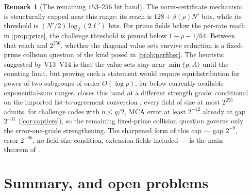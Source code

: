 \documentclass[11pt]{article}
\theoremstyle{definition}
\newtheorem{remark}[remark]{Remark}
\newcommand{\Acl}{A}
\begin{document}
\begin{remark}[The remaining $153$--$256$ bit band]\label{rem:capstone}
The norm-certificate mechanism is structurally capped near this range: its reach is $128+\beta(\rho)N'$ bits, while its threshold is $(N'/2)\log_2(2\ell')$ bits.  For prime fields below the per-rate reach in \cref{prop:prize}, the challenge threshold is pinned below $1-\rho-1/64$.  Between that reach and $2^{256}$, whether the diagonal value sets survive reduction is a fixed-prime collision question of the kind posed in \cref{prob:perfiber}.  The heuristic suggested by V13--V14 is that the value sets stay near $\min\{p,\Acl\}$ until the counting limit, but proving such a statement would require equidistribution for power-of-two subgroups of order $O(\log p)$, far below currently available exponential-sum ranges.   closes this band at a different strength grade: conditional on the imported list-to-agreement conversion \cite{CS25,ABF26}, every field of size at most $2^{256}$ admits, for challenge codes with $n\le q/2$, MCA error at least $2^{-42}$ already at gap $2^{-11}$ (\cref{cor:captiers}), so the remaining fixed-prime collision question governs only the error-one-grade strengthening.  The sharpened form of this cap --- gap $2^{-9}$, error $2^{-86}$, no field-size condition, extension fields included --- is the main theorem of \cite{UniversalCap}.
\end{remark}


\section{Summary, and open problems}\label{sec:frontier}
\end{document}
